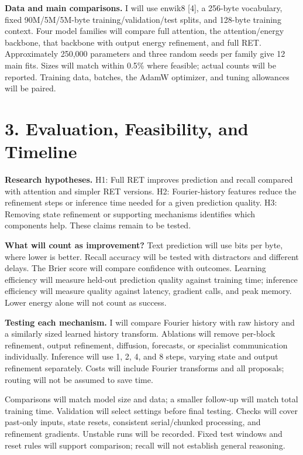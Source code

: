 \documentclass[11pt,letterpaper]{article}
\begin{document}
\textbf{Data and main comparisons.} I will use enwik8 [4], a 256-byte vocabulary, fixed 90M/5M/5M-byte training/validation/test splits, and 128-byte training context. Four model families will compare full attention, the attention/energy backbone, that backbone with output energy refinement, and full RET. Approximately 250,000 parameters and three random seeds per family give 12 main fits. Sizes will match within 0.5\% where feasible; actual counts will be reported. Training data, batches, the AdamW optimizer, and tuning allowances will be paired.

\newpage
\section*{3. Evaluation, Feasibility, and Timeline}

\textbf{Research hypotheses.} H1: Full RET improves prediction and recall compared with attention and simpler RET versions. H2: Fourier-history features reduce the refinement steps or inference time needed for a given prediction quality. H3: Removing state refinement or supporting mechanisms identifies which components help. These claims remain to be tested.

\textbf{What will count as improvement?} Text prediction will use bits per byte, where lower is better. Recall accuracy will be tested with distractors and different delays. The Brier score will compare confidence with outcomes. Learning efficiency will measure held-out prediction quality against training time; inference efficiency will measure quality against latency, gradient calls, and peak memory. Lower energy alone will not count as success.

\textbf{Testing each mechanism.} I will compare Fourier history with raw history and a similarly sized learned history transform. Ablations will remove per-block refinement, output refinement, diffusion, forecasts, or specialist communication individually. Inference will use 1, 2, 4, and 8 steps, varying state and output refinement separately. Costs will include Fourier transforms and all proposals; routing will not be assumed to save time.

Comparisons will match model size and data; a smaller follow-up will match total training time. Validation will select settings before final testing. Checks will cover past-only inputs, state resets, consistent serial/chunked processing, and refinement gradients. Unstable runs will be recorded. Fixed test windows and reset rules will support comparison; recall will not establish general reasoning.
\end{document}
